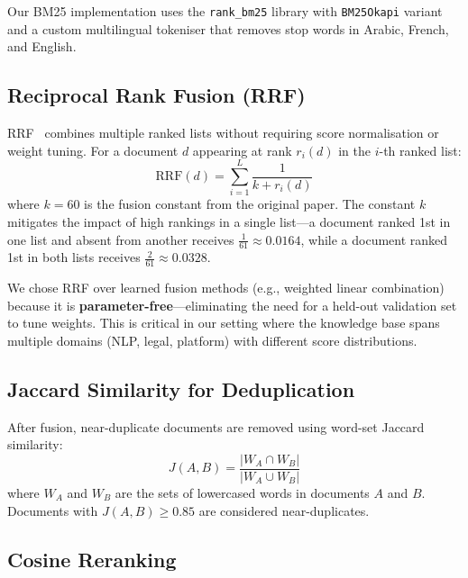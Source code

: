 \documentclass[12pt, a4paper]{article}
\begin{document}
Our BM25 implementation uses the \texttt{rank\_bm25} library with
\texttt{BM25Okapi} variant and a custom multilingual tokeniser that removes
stop words in Arabic, French, and English.

\subsection{Reciprocal Rank Fusion (RRF)}
\label{sec:rrf}

RRF~\cite{cormack2009rrf} combines multiple ranked lists without requiring
score normalisation or weight tuning. For a document $d$ appearing at rank
$r_i(d)$ in the $i$-th ranked list:
\begin{equation}
  \text{RRF}(d) = \sum_{i=1}^{L} \frac{1}{k + r_i(d)}
  \label{eq:rrf}
\end{equation}
where $k = 60$ is the fusion constant from the original paper. The constant
$k$ mitigates the impact of high rankings in a single list---a document ranked
1st in one list and absent from another receives $\frac{1}{61} \approx 0.0164$,
while a document ranked 1st in both lists receives $\frac{2}{61} \approx 0.0328$.

\begin{notebox}
We chose RRF over learned fusion methods (e.g., weighted linear combination)
because it is \textbf{parameter-free}---eliminating the need for a
held-out validation set to tune weights. This is critical in our setting
where the knowledge base spans multiple domains (NLP, legal, platform)
with different score distributions.
\end{notebox}

\subsection{Jaccard Similarity for Deduplication}

After fusion, near-duplicate documents are removed using word-set Jaccard
similarity:
\begin{equation}
  J(A, B) = \frac{|W_A \cap W_B|}{|W_A \cup W_B|}
  \label{eq:jaccard}
\end{equation}
where $W_A$ and $W_B$ are the sets of lowercased words in documents $A$ and
$B$. Documents with $J(A, B) \geq 0.85$ are considered near-duplicates.

\subsection{Cosine Reranking}
\end{document}
